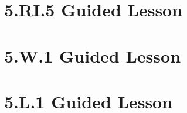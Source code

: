 \documentclass[a4paper,12pt]{article}
\begin{document}
\newpage
\section{5.RI.5 Guided Lesson}

% 



% 

%

\newpage
\section{5.W.1 Guided Lesson}


% 

\newpage
\section{5.L.1 Guided Lesson}



% 
% 
\end{document}
